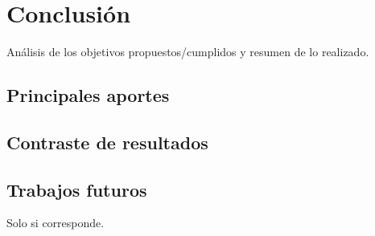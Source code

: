 \chapter{Conclusión}
Análisis de los objetivos propuestos/cumplidos y resumen de lo realizado.
\section{Principales aportes}
\section{Contraste de resultados}
\section{Trabajos futuros}
Solo si corresponde.